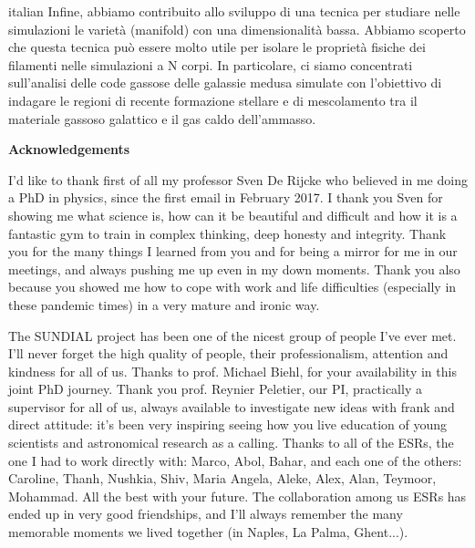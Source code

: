 \begin{otherlanguage*}{italian}
Infine, abbiamo contribuito allo sviluppo di una tecnica per studiare nelle simulazioni le varietà (manifold) con una dimensionalità bassa.
Abbiamo scoperto che questa tecnica può essere molto utile per isolare le proprietà fisiche dei filamenti nelle simulazioni a N corpi.
In particolare, ci siamo concentrati sull'analisi delle code gassose delle galassie medusa simulate con l'obiettivo di indagare le regioni di recente formazione stellare e di mescolamento tra il materiale gassoso galattico e il gas caldo dell'ammasso.
\end{otherlanguage*}


\clearpage
\thispagestyle{empty}
\null%
\label{thesis:acknowledgements}
\begin{center}
  {\Large \textbf{Acknowledgements}}\\
\end{center}
I'd like to thank first of all my professor Sven De Rijcke who believed in me doing a PhD in physics, since the first email in February 2017.
I thank you Sven for showing me what science is, how can it be beautiful and difficult and how it is a fantastic gym to train in complex thinking, deep honesty and integrity.
Thank you for the many things I learned from you and for being a mirror for me in our meetings, and always pushing me up even in my down moments.
Thank you also because you showed me how to cope with work and life difficulties (especially in these pandemic times) in a very mature and ironic way.

The SUNDIAL project has been one of the nicest group of people I've ever met.
I'll never forget the high quality of people, their professionalism, attention and kindness for all of us. Thanks to prof. Michael Biehl, for your availability in this joint PhD journey.
Thank you prof. Reynier Peletier, our PI, practically a supervisor for all of us, always available to investigate new ideas with frank and direct attitude: %
it's been very inspiring seeing how you live education of young scientists and astronomical research as a calling.
Thanks to all of the ESRs, the one I had to work directly with: Marco, Abol, Bahar, and each one of the others: Caroline, Thanh, Nushkia, Shiv, Maria Angela, Aleke, Alex, Alan, Teymoor, Mohammad. All the best with your future.
The collaboration among us ESRs has ended up in very good friendships, and I'll always remember the many memorable moments we lived together (in Naples, La Palma, Ghent...).

